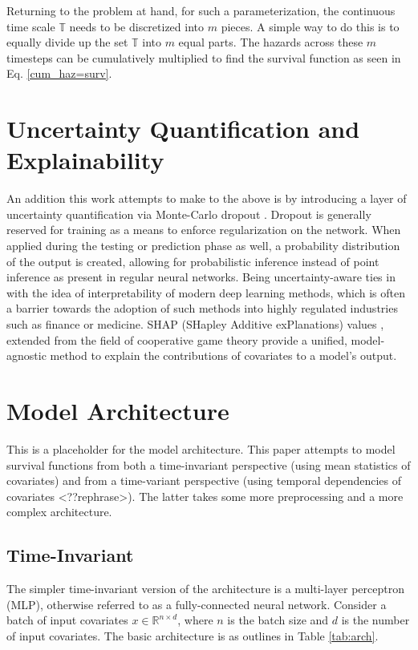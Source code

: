 \documentclass[%
 reprint,
 amsmath,amssymb,
 aps,
]{revtex4-2}
\begin{document}
Returning to the problem at hand, for such a parameterization, the continuous time scale $\mathbb{T}$ needs to be discretized into $m$ pieces. A simple way to do this is to equally divide up the set $\mathbb{T}$ into $m$ equal parts. The hazards across these $m$ timesteps can be cumulatively multiplied to find the survival function as seen in Eq. \ref{cum_haz=surv}.

\section{\label{UQ_explain}Uncertainty Quantification and Explainability}
An addition this work attempts to make to the above is by introducing a layer of uncertainty quantification via Monte-Carlo dropout \cite{mcdropout}. Dropout is generally reserved for training as a means to enforce regularization on the network. When applied during the testing or prediction phase as well, a probability distribution of the output is created, allowing for probabilistic inference instead of point inference as present in regular neural networks. Being uncertainty-aware ties in with the idea of interpretability of modern deep learning methods, which is often a barrier towards the adoption of such methods into highly regulated industries such as finance or medicine. SHAP (SHapley Additive exPlanations) values \cite{shap}, extended from the field of cooperative game theory provide a unified, model-agnostic method to explain the contributions of covariates to a model's output.

\section{\label{model_arch}Model Architecture}
This is a placeholder for the model architecture.
This paper attempts to model survival functions from both a time-invariant perspective (using mean statistics of covariates) and from a time-variant perspective (using temporal dependencies of covariates <??rephrase>). The latter takes some more preprocessing and a more complex architecture.

\subsection{\label{time_invar_arch}Time-Invariant}
The simpler time-invariant version of the architecture is a multi-layer perceptron (MLP), otherwise referred to as a fully-connected neural network. Consider a batch of input covariates $x \in \mathbb{R}^{n\times d}$, where $n$ is the batch size and $d$ is the number of input covariates. The basic architecture is as outlines in Table \ref{tab:arch}.\\
\end{document}
